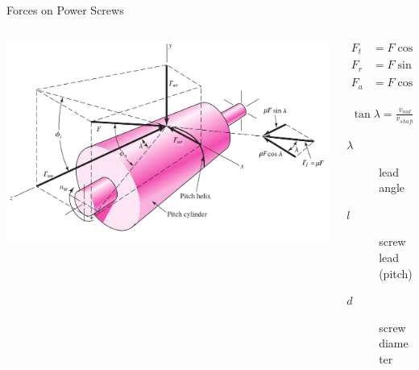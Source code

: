 \documentclass[10pt, svgnames]{beamer}
\begin{document}
\begin{frame}[label={sec:org3f9bc70}]{Forces on Power Screws}
\begin{columns}
\begin{column}{0.6\columnwidth}
\begin{center}
\includegraphics[width=\textwidth]{./pictures/screw-forces.jpg}
\end{center}

\begin{figure}
\end{figure}
\normalcolor
\end{column}

\begin{column}{0.5\columnwidth}
\begin{align*}
  F_{t} &= F \cos \phi_{n} \sin \lambda + \mu F \cos \lambda \\
  F_{r} &= F \sin \phi_{n} \\
  F_{a} &= F \cos \phi_{n} \cos \lambda - \mu F \sin \lambda
\end{align*}

\begin{align*}
  \tan \lambda = \frac{v_{nut}}{v_{shaft}} = \frac{l}{\pi d}
\end{align*}

\begin{description}
\item[{\(\lambda\)}] lead angle
\item[{\(l\)}] screw lead (pitch)
\item[{\(d\)}] screw diameter
\end{description}
\end{column}
\end{columns}
\end{frame}
\end{document}
